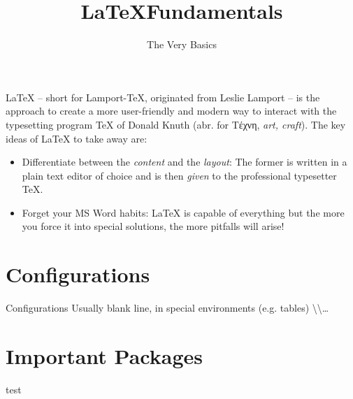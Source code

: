 

\title{\LaTeX Fundamentals}
\subtitle{The Very Basics}
\date{}



\pagestyle{empty}
\backgroundframe
\maketitle
%

%
\LaTeX{} -- short for Lamport-\TeX{}, originated from Leslie Lamport -- is the approach to create a more user-friendly and modern way to interact with the typesetting program \TeX{} of Donald Knuth (abr. for \textgreek{Τέχνη}, \textit{art, craft}).
%
The key ideas of \LaTeX{} to take away are:
%
\begin{itemize}
  \item Differentiate between the \textit{content} and the \textit{layout}: The former is written in a plain text editor of choice and is then \textit{given} to the professional typesetter \TeX{}.
  \item Forget your MS Word habits: \LaTeX{} is capable of everything but the more you force it into special solutions, the more pitfalls will arise!
\end{itemize}

\section*{Configurations}
%
Configurations
Usually blank line, in special environments (e.g. tables) \textbackslash\textbackslash \ldots

\section*{Important Packages}

test





